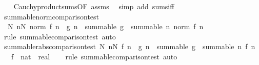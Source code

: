 \begin{isabellebody}
%
\isadelimproof
\ \ %
\endisadelimproof
%
\isatagproof
{}\isamarkupfalse%
\ Cauchy{\isacharunderscore}{\kern0pt}product{\isacharunderscore}{\kern0pt}sums{\isacharbrackleft}{\kern0pt}OF\ assms{\isacharbrackright}{\kern0pt}\ \isamarkupfalse%
\ {\isacharparenleft}{\kern0pt}simp\ add{\isacharcolon}{\kern0pt}\ sums{\isacharunderscore}{\kern0pt}iff{\isacharparenright}{\kern0pt}%
\endisatagproof
{\isafoldproof}%
%
\isadelimproof
%
\endisadelimproof
%
\isadelimdocument
%
\endisadelimdocument
%
\isatagdocument
%
\isamarkuptrue%
%
\endisatagdocument
{\isafolddocument}%
%
\isadelimdocument
%
\endisadelimdocument
{}\isamarkupfalse%
\ summable{\isacharunderscore}{\kern0pt}norm{\isacharunderscore}{\kern0pt}comparison{\isacharunderscore}{\kern0pt}test{\isacharcolon}{\kern0pt}\isanewline
\ \ {\isachardoublequoteopen}{\isasymexists}N{\isachardot}{\kern0pt}\ {\isasymforall}n{\isasymge}N{\isachardot}{\kern0pt}\ norm\ {\isacharparenleft}{\kern0pt}f\ n{\isacharparenright}{\kern0pt}\ {\isasymle}\ g\ n\ {\isasymLongrightarrow}\ summable\ g\ {\isasymLongrightarrow}\ summable\ {\isacharparenleft}{\kern0pt}{\isasymlambda}n{\isachardot}{\kern0pt}\ norm\ {\isacharparenleft}{\kern0pt}f\ n{\isacharparenright}{\kern0pt}{\isacharparenright}{\kern0pt}{\isachardoublequoteclose}\isanewline
%
\isadelimproof
\ \ %
\endisadelimproof
%
\isatagproof
{}\isamarkupfalse%
\ {\isacharparenleft}{\kern0pt}rule\ summable{\isacharunderscore}{\kern0pt}comparison{\isacharunderscore}{\kern0pt}test{\isacharparenright}{\kern0pt}\ auto%
\endisatagproof
{\isafoldproof}%
%
\isadelimproof
\isanewline
%
\endisadelimproof
\isanewline
{}\isamarkupfalse%
\ summable{\isacharunderscore}{\kern0pt}rabs{\isacharunderscore}{\kern0pt}comparison{\isacharunderscore}{\kern0pt}test{\isacharcolon}{\kern0pt}\ {\isachardoublequoteopen}{\isasymexists}N{\isachardot}{\kern0pt}\ {\isasymforall}n{\isasymge}N{\isachardot}{\kern0pt}\ {\isasymbar}f\ n{\isasymbar}\ {\isasymle}\ g\ n\ {\isasymLongrightarrow}\ summable\ g\ {\isasymLongrightarrow}\ summable\ {\isacharparenleft}{\kern0pt}{\isasymlambda}n{\isachardot}{\kern0pt}\ {\isasymbar}f\ n{\isasymbar}{\isacharparenright}{\kern0pt}{\isachardoublequoteclose}\isanewline
\ \ \ f\ {\isacharcolon}{\kern0pt}{\isacharcolon}{\kern0pt}\ {\isachardoublequoteopen}nat\ {\isasymRightarrow}\ real{\isachardoublequoteclose}\isanewline
%
\isadelimproof
\ \ %
\endisadelimproof
%
\isatagproof
{}\isamarkupfalse%
\ {\isacharparenleft}{\kern0pt}rule\ summable{\isacharunderscore}{\kern0pt}comparison{\isacharunderscore}{\kern0pt}test{\isacharparenright}{\kern0pt}\ auto%

\end{isabellebody}
